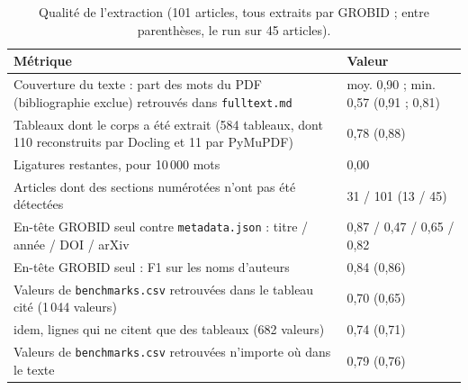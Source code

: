 \documentclass[11pt,a4paper]{article}
\newcommand{\cmd}[1]{\texttt{#1}}
\begin{document}
\begin{table}[ht]
\centering
\caption{Qualité de l'extraction (101 articles, tous extraits par GROBID ; entre parenthèses, le run sur 45 articles).}
\label{tab:extraction}
\small
\begin{tabularx}{\linewidth}{@{}Ll@{}}
\toprule
Métrique & Valeur \\
\midrule
Couverture du texte : part des mots du PDF (bibliographie exclue) retrouvés dans \cmd{fulltext.md} & moy. 0,90 ; min. 0,57 (0,91 ; 0,81) \\
Tableaux dont le corps a été extrait (584 tableaux, dont 110 reconstruits par Docling et 11 par PyMuPDF) & 0,78 (0,88) \\
Ligatures restantes, pour 10\,000 mots & 0,00 \\
Articles dont des sections numérotées n'ont pas été détectées & 31 / 101 (13 / 45) \\
En-tête GROBID seul contre \cmd{metadata.json} : titre / année / DOI / arXiv & 0,87 / 0,47 / 0,65 / 0,82 \\
En-tête GROBID seul : F1 sur les noms d'auteurs & 0,84 (0,86) \\
Valeurs de \cmd{benchmarks.csv} retrouvées dans le tableau cité (1\,044 valeurs) & 0,70 (0,65) \\
\quad idem, lignes qui ne citent que des tableaux (682 valeurs) & 0,74 (0,71) \\
Valeurs de \cmd{benchmarks.csv} retrouvées n'importe où dans le texte & 0,79 (0,76) \\
\bottomrule
\end{tabularx}
\end{table}
\end{document}
